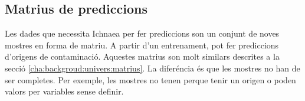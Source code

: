 \subsection{Matrius de prediccions}
Les dades que necessita Ichnaea per fer prediccions son un conjunt de noves mostres en forma de matriu. A partir d'un entrenament, pot fer prediccions d'origens de contaminaci\'{o}. Aquestes matrius son molt similars descrites a la secci\'{o} \ref{cha:backgroud:univers:matrius}. La difer\'{e}ncia \'{e}s que les mostres no han de ser completes. Per exemple, les mostres no tenen perque tenir un origen o poden valors per variables sense definir.